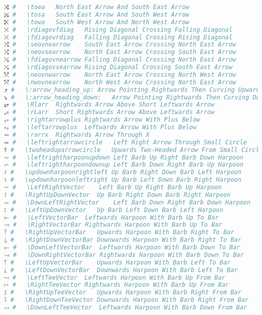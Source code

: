 \begin{lstlisting}[language=Julia, style=julia, linewidth=\textwidth]
⤨ #   \toea   North East Arrow And South East Arrow
⤩ #   \tosa   South East Arrow And South West Arrow
⤪ #   \towa   South West Arrow And North West Arrow
⤫ #   \rdiagovfdiag   Rising Diagonal Crossing Falling Diagonal
⤬ #   \fdiagovrdiag   Falling Diagonal Crossing Rising Diagonal
⤭ #   \seovnearrow    South East Arrow Crossing North East Arrow
⤮ #   \neovsearrow    North East Arrow Crossing South East Arrow
⤯ #   \fdiagovnearrow Falling Diagonal Crossing North East Arrow
⤰ #   \rdiagovsearrow Rising Diagonal Crossing South East Arrow
⤱ #   \neovnwarrow    North East Arrow Crossing North West Arrow
⤲ #   \nwovnearrow    North West Arrow Crossing North East Arrow
⤴ #   \:arrow_heading_up: Arrow Pointing Rightwards Then Curving Upwards
⤵ #   \:arrow_heading_down:   Arrow Pointing Rightwards Then Curving Downwards
⥂ #   \Rlarr  Rightwards Arrow Above Short Leftwards Arrow
⥄ #   \rLarr  Short Rightwards Arrow Above Leftwards Arrow
⥅ #   \rightarrowplus Rightwards Arrow With Plus Below
⥆ #   \leftarrowplus  Leftwards Arrow With Plus Below
⥇ #   \rarrx  Rightwards Arrow Through X
⥈ #   \leftrightarrowcircle   Left Right Arrow Through Small Circle
⥉ #   \twoheaduparrowcircle   Upwards Two-Headed Arrow From Small Circle
⥊ #   \leftrightharpoonupdown Left Barb Up Right Barb Down Harpoon
⥋ #   \leftrightharpoondownup Left Barb Down Right Barb Up Harpoon
⥌ #   \updownharpoonrightleft Up Barb Right Down Barb Left Harpoon
⥍ #   \updownharpoonleftright Up Barb Left Down Barb Right Harpoon
⥎ #   \LeftRightVector    Left Barb Up Right Barb Up Harpoon
⥏ #   \RightUpDownVector  Up Barb Right Down Barb Right Harpoon
⥐ #   \DownLeftRightVector    Left Barb Down Right Barb Down Harpoon
⥑ #   \LeftUpDownVector   Up Barb Left Down Barb Left Harpoon
⥒ #   \LeftVectorBar  Leftwards Harpoon With Barb Up To Bar
⥓ #   \RightVectorBar Rightwards Harpoon With Barb Up To Bar
⥔ #   \RightUpVectorBar   Upwards Harpoon With Barb Right To Bar
⥕ #   \RightDownVectorBar Downwards Harpoon With Barb Right To Bar
⥖ #   \DownLeftVectorBar  Leftwards Harpoon With Barb Down To Bar
⥗ #   \DownRightVectorBar Rightwards Harpoon With Barb Down To Bar
⥘ #   \LeftUpVectorBar    Upwards Harpoon With Barb Left To Bar
⥙ #   \LeftDownVectorBar  Downwards Harpoon With Barb Left To Bar
⥚ #   \LeftTeeVector  Leftwards Harpoon With Barb Up From Bar
⥛ #   \RightTeeVector Rightwards Harpoon With Barb Up From Bar
⥜ #   \RightUpTeeVector   Upwards Harpoon With Barb Right From Bar
⥝ #   \RightDownTeeVector Downwards Harpoon With Barb Right From Bar
⥞ #   \DownLeftTeeVector  Leftwards Harpoon With Barb Down From Bar

\end{lstlisting}
